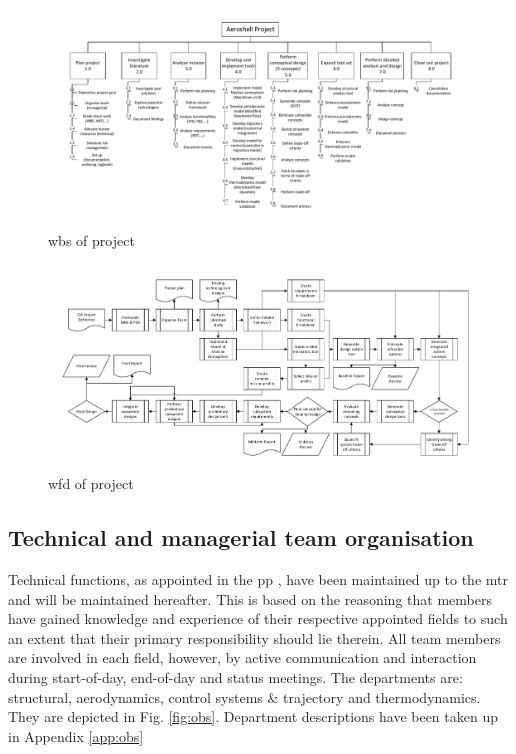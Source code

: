 \begin{figure}
    \includegraphics[scale=0.85]{Figure/WBS_MTR.pdf}
    \caption{\acrfull{wbs} of project}
    \label{fig:wbs}
\end{figure}
\begin{figure}
    \includegraphics[scale=0.85]{Figure/WFD_MTR.pdf}
    \caption{\acrfull{wfd} of project}
    \label{fig:wfd}
\end{figure}

\subsection{Technical and managerial team organisation}
\label{sec:org}
Technical functions, as appointed in the \acrfull{pp} \cite{Balasooriyan2015}, have been maintained up to the \gls{mtr} and will be maintained hereafter. This is based on the reasoning that members have gained knowledge and experience of their respective appointed fields to such an extent that their primary responsibility should lie therein. All team members are involved in each field, however, by active communication and interaction during start-of-day, end-of-day and status meetings. The departments are: structural, aerodynamics, control systems $\&$ trajectory and thermodynamics. They are depicted in Fig. \ref{fig:obs}. Department descriptions have been taken up in Appendix \ref{app:obs}

